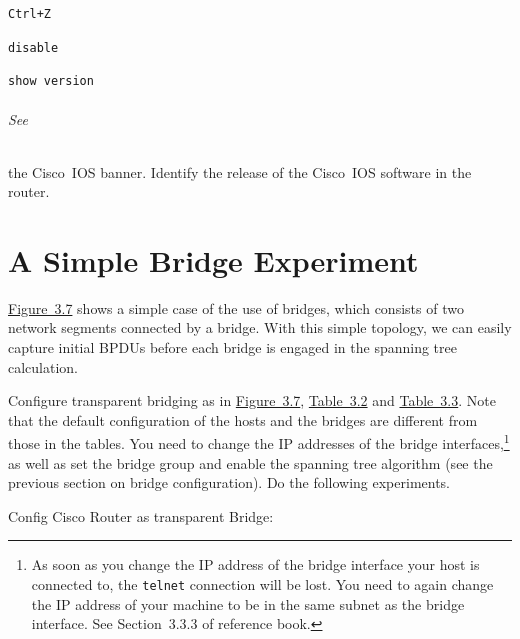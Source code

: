\documentclass{UTNetLab}
\begin{document}
    \begin{lstlisting}[frame=trBL]
    Ctrl+Z
    \end{lstlisting}
    
    \begin{lstlisting}[frame=trBL]
    disable
    \end{lstlisting}
    
    \begin{lstlisting}[frame=trBL]
    show version
    \end{lstlisting}
    
\paragraph{See} the Cisco~IOS banner.
Identify the release of the Cisco~IOS software in the router.

\part{A Simple Bridge Experiment}
    \hyperref[fig:3.7]{Figure~3.7} shows a simple case of the use of bridges, which consists of two network segments connected by a bridge.
    With this simple topology, we can easily capture initial BPDUs before each bridge is engaged in the spanning tree calculation.

    Configure transparent bridging as in \hyperref[fig:3.7]{Figure~3.7}, \hyperref[tab:3.2]{Table~3.2} and \hyperref[tab:3.3]{Table~3.3}.
    Note that the default configuration of the hosts and the bridges are different from those in the tables.
    You need to change the IP addresses of the bridge interfaces,\footnote{As soon as you change the IP address of the bridge interface your host is connected to, the \lstinline{telnet} connection will be lost.
    You need to again change the IP address of your machine to be in the same subnet as the bridge interface. See Section~3.3.3  of reference book.} as well as set the bridge group and enable the spanning tree algorithm (see the previous section on bridge configuration).
    Do the following experiments.

    Config Cisco Router as transparent Bridge:
    
\end{document}
